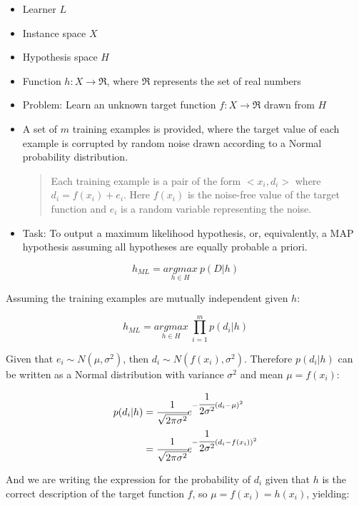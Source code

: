 \begin{itemize}
\item
  Learner \(L\)
\item
  Instance space \(X\)
\item
  Hypothesis space \(H\)
\item
  Function \(h:X\rightarrow\mathfrak{R}\), where \(\mathfrak{R}\)
  represents the set of real numbers
\item
  Problem: Learn an unknown target function
  \(f:X\rightarrow\mathfrak{R}\) drawn from \(H\)
\item
  A set of \(m\) training examples is provided, where the target value
  of each example is corrupted by random noise drawn according to a
  Normal probability distribution.

  \begin{quote}
  Each training example is a pair of the form \(<x_i,d_i>\) where
  \(d_i=f(x_i)+e_i\). Here \(f(x_i)\) is the noise-free value of the
  target function and \(e_i\) is a random variable representing the
  noise.
  \end{quote}
\item
  Task: To output a maximum likelihood hypothesis, or, equivalently, a
  MAP hypothesis assuming all hypotheses are equally probable a priori.
\end{itemize}

\[h_{ML}=\underset{h\in H}{argmax}\ p(D|h)\]

Assuming the training examples are mutually independent given \(h\):

\[h_{ML}=\underset{h\in H}{argmax}\ \prod_{i=1}^{m}p(d_i|h)\]

Given that \(e_i\sim N(\mu, \sigma^2)\), then
\(d_i\sim N(f(x_i),\sigma^2)\). Therefore \(p(d_i|h)\) can be written as
a Normal distribution with variance \(\sigma^2\) and mean
\(\mu=f(x_i)\):

\begin{equation*}
\begin{aligned}
p(d_i|h)&=\cfrac{1}{\sqrt{2\pi\sigma^2}}e^{-\cfrac{1}{2\sigma^2}(d_i-\mu)^2}\\
&=\cfrac{1}{\sqrt{2\pi\sigma^2}}e^{-\cfrac{1}{2\sigma^2}(d_i-f(x_i))^2}
\end{aligned}
\end{equation*}

And we are writing the expression for the probability of \(d_i\) given
that \(h\) is the correct description of the target function \(f\), so
\(\mu=f(x_i)=h(x_i)\), yielding:

